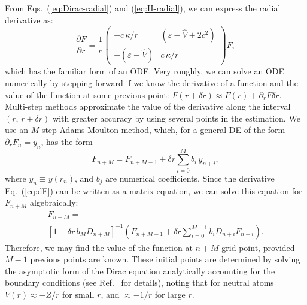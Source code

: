 \documentclass[10pt,twocolumn,a4paper]{article}%
\newcommand{\matr}[4]{\ensuremath{\begin{pmatrix}#1&#2\\#3&#4\end{pmatrix}}}	%
\newcommand{\be}{\begin{equation}}
\newcommand{\ee}{\end{equation}}
\def\en{\ensuremath{\varepsilon}}
\def\p{\ensuremath{\partial}}
\renewcommand{\k}{\ensuremath{\kappa}}
\begin{document}
From Eqs.~(\ref{eq:Dirac-radial}) and (\ref{eq:H-radial}), we can express the radial derivative as:
\be\label{eq:dF}
\frac{\p F}{\p r}
=\frac{1}{c} \matr 	{-c\,{\k}/{r}} 	{(\en - \hat V+2c^2)}  {-(\en - \hat V)} 	 {c\,{\k}/{r}}F,
\ee
which has the familiar form of an ODE.
Very roughly, we can solve an ODE numerically by stepping forward if we know the derivative of a function and the value of the function at some previous point: $F(r+\delta r) \approx F(r) + {\p_r F}\delta r$.
Multi-step methods approximate the value of the derivative along the interval $(r, \, r+\delta r)$ with greater accuracy by using several points in the estimation. 
We use an $M$-step Adams-Moulton method,
which, for a general DE of the form $\p_r F_n  = y_n$, has the form
\be\label{eq:Adams}
F_{n+M} = F_{n+M-1} + \delta r \sum_{i=0}^M b_i \, y_{n+i},
\ee
where $y_n\equiv y(r_n)$, and $b_j$ are numerical coefficients. %
Since the derivative Eq.~(\ref{eq:dF}) can be written as a matrix equation, we can solve this equation for $F_{n+M}$ algebraically:
\begin{multline}
F_{n+M} = \\\left[1 - \delta r\,b_M D_{n+M}\right]^{-1}\left(F_{n+M-1} + \delta r \sum_{i=0}^{M-1} b_i D_{n+i}F_{n+i}\right).
\end{multline}
Therefore, we may find the value of the function at ${n+M}$ grid-point, provided $M-1$ previous points are known.
These initial points are determined by solving the asymptotic form of the Dirac equation analytically accounting for the boundary conditions (see Ref.~\cite{JohnsonBook2007} for details), noting that for neutral atoms $V(r)\approx-Z/r$ for small $r$, and 
$\approx-1/r$ for large $r$. %
\end{document}
